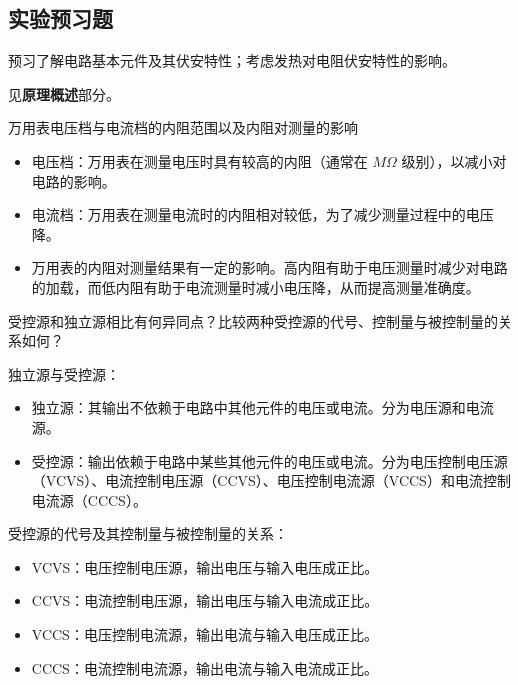 \documentclass[dvipsnames, svgnames,a4paper,11pt]{article}
\begin{document}
	
	
	
	\subsection{实验预习题}
	
	\begin{question}
		预习了解电路基本元件及其伏安特性；考虑发热对电阻伏安特性的影响。
	\end{question}
	见\textbf{原理概述}部分。
	
	\begin{question}
		万用表电压档与电流档的内阻范围以及内阻对测量的影响
	\end{question}
	\begin{itemize}
		\item 电压档：万用表在测量电压时具有较高的内阻（通常在 \(M\Omega\) 级别），以减小对电路的影响。
		\item 电流档：万用表在测量电流时的内阻相对较低，为了减少测量过程中的电压降。
		\item 万用表的内阻对测量结果有一定的影响。高内阻有助于电压测量时减少对电路的加载，而低内阻有助于电流测量时减小电压降，从而提高测量准确度。
	\end{itemize}
	
	\begin{question}
		受控源和独立源相比有何异同点？比较两种受控源的代号、控制量与被控制量的关系如何？
	\end{question}
	独立源与受控源：
	\begin{itemize}
		\item 独立源：其输出不依赖于电路中其他元件的电压或电流。分为电压源和电流源。
		\item 受控源：输出依赖于电路中某些其他元件的电压或电流。分为电压控制电压源（VCVS）、电流控制电压源（CCVS）、电压控制电流源（VCCS）和电流控制电流源（CCCS）。
	\end{itemize}
	
	受控源的代号及其控制量与被控制量的关系：
	\begin{itemize}
		\item VCVS：电压控制电压源，输出电压与输入电压成正比。
		\item CCVS：电流控制电压源，输出电压与输入电流成正比。
		\item VCCS：电压控制电流源，输出电流与输入电压成正比。
		\item CCCS：电流控制电流源，输出电流与输入电流成正比。
	\end{itemize}
	
\end{document}
